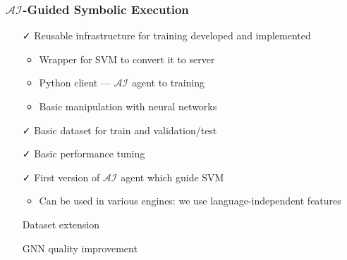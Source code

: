 \documentclass[xcolor=table,aspectratio=169]{beamer}
\begin{document}
\begin{frame}[fragile]
  \frametitle{$\mathcal{AI}$-Guided Symbolic Execution}  
  \begin{itemize}
    \item[\faCheck] Reusable infrastructure for training developed and implemented
      \begin{itemize}
        \item Wrapper for SVM to convert it to server
        \item Python client --- $\mathcal{AI}$ agent to training
        \item Basic manipulation with neural networks 
      \end{itemize}
    \item[\faCheck] Basic dataset for train and validation/test
    \item[\faCheck] Basic performance tuning
    \item[\faCheck] First version of $\mathcal{AI}$ agent which guide SVM
    \begin{itemize}
      \item Can be used in various engines: we use language-independent features 
    \end{itemize}
    \item[\faGears] Dataset extension
    \item[\faGears] GNN quality improvement 
  \end{itemize}
\end{frame}
\end{document}

